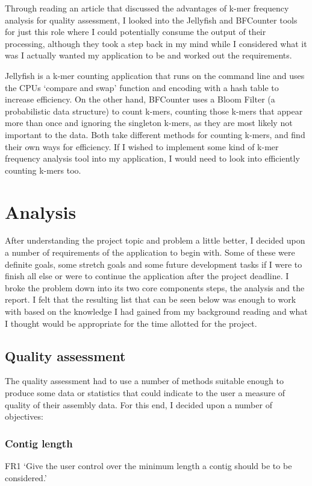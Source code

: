 Through reading an article that discussed the advantages of k-mer frequency analysis for quality assessment, I looked into the Jellyfish\cite{citeulike:8643499} and BFCounter\cite{citeulike:9639487} tools for just this role where I could potentially consume the output of their processing, although they took a step back in my mind while I considered what it was I actually wanted my application to be and worked out the requirements.

Jellyfish is a k-mer counting application that runs on the command line and uses the CPUs `compare and swap' function and encoding with a hash table to increase efficiency. On the other hand, BFCounter uses a Bloom Filter (a probabilistic data structure) to count k-mers, counting those k-mers that appear more than once and ignoring the singleton k-mers, as they are most likely not important to the data. Both take different methods for counting k-mers, and find their own ways for efficiency. If I wished to implement some kind of k-mer frequency analysis tool into my application, I would need to look into efficiently counting k-mers too.


\section{Analysis}
After understanding the project topic and problem a little better, I decided upon a number of requirements of the application to begin with. Some of these were definite goals, some stretch goals and some future development tasks if I were to finish all else or were to continue the application after the project deadline. I broke the problem down into its two core components steps, the analysis and the report. I felt that the resulting list that can be seen below was enough to work with based on the knowledge I had gained from my background reading and what I thought would be appropriate for the time allotted for the project.

\subsection{Quality assessment}
The quality assessment had to use a number of methods suitable enough to produce some data or statistics that could indicate to the user a measure of quality of their assembly data. For this end, I decided upon a number of objectives:

\subsubsection{Contig length}
FR1 `Give the user control over the minimum length a contig should be to be considered.'

